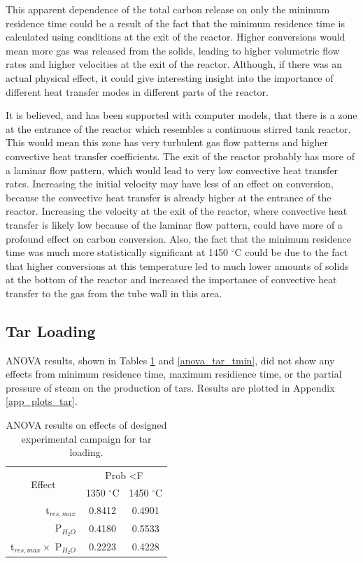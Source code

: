 \documentclass[11pt,twocolumn]{article}
\begin{document}
This apparent dependence of the total carbon release on only the minimum residence time could be a result of the fact that the minimum residence time is calculated using conditions at the exit of the reactor.  Higher conversions would mean more gas was released from the solids, leading to higher volumetric flow rates and higher velocities at the exit of the reactor.  Although, if there was an actual physical effect, it could give interesting insight into the importance of different heat transfer modes in different parts of the reactor.  

It is believed, and has been supported with computer models, that there is a zone at the entrance of the reactor which resembles a continuous stirred tank reactor.  This would mean this zone has very turbulent gas flow patterns and higher convective heat transfer coefficients.  The exit of the reactor probably has more of a laminar flow pattern, which would lead to very low convective heat transfer rates.  Increasing the initial velocity may have less of an effect on conversion, because the convective heat transfer is already higher at the entrance of the reactor.  Increasing the velocity at the exit of the reactor, where convective heat transfer is likely low because of the laminar flow pattern, could have more of a profound effect on carbon conversion.  Also, the fact that the minimum residence time was much more statistically significant at 1450 $^\circ$C could be due to the fact that higher conversions at this temperature led to much lower amounts of solids at the bottom of the reactor and increased the importance of convective heat transfer to the gas from the tube wall in this area.

\subsection*{Tar Loading}

ANOVA results, shown in Tables \ref{anova_tar} and \ref{anova_tar_tmin}, did not show any effects from minimum residence time, maximum residience time, or the partial pressure of steam on the production of tars.  Results are plotted in Appendix \ref{app_plots_tar}.

\begin{table}
	\centering
	\caption{ANOVA results on effects of designed experimental campaign for tar loading.}
	\begin{tabular}{r c c}
		\toprule
		\multicolumn{1}{c}{\multirow{2}{*}{Effect}}		& 	\multicolumn{2}{c}{Prob \textless F	}	\\
		{}								&	1350 $^\circ$C					&	1450 $^\circ$C			\\
		\midrule
		t$_{res,max}$						&	0.8412						&	0.4901			\\
		P$_{H_2O}$						&	0.4180						&	0.5533			\\
		t$_{res,max}\times$ P$_{H_2O}$		&	0.2223						&	0.4228			\\
		\bottomrule
	\end{tabular}
	\label{anova_tar}
\end{table}
\end{document}
